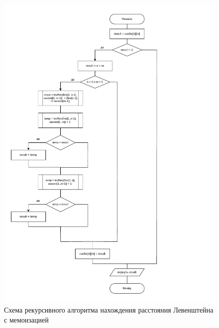 \clearpage

\begin{figure}[h!]
	\centering
	\includegraphics[height=0.8\textheight]{tex_parts/scheme2.pdf}
	\caption{\label{fig:levMem}Схема рекурсивного алгоритма нахождения расстояния Левенштейна с мемоизацией}
\end{figure}

\clearpage

